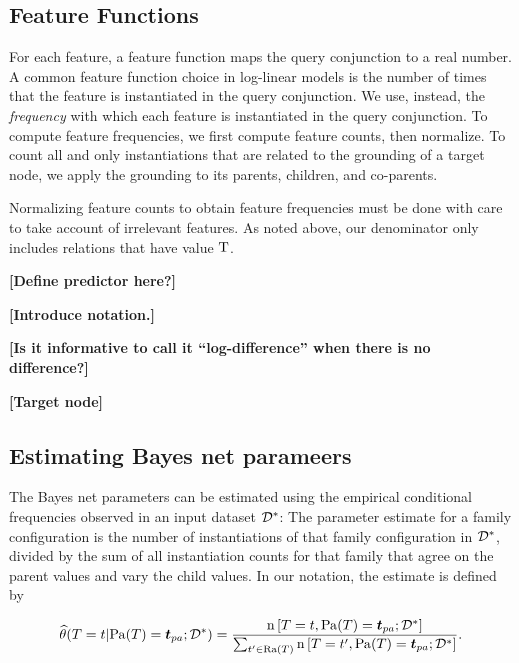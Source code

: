 \documentclass[runningheads,a4paper]{llncs}
\newcommand{\fixneeded}[1]{\textbf{[\footnotesize #1]}}
\begin{document}
\subsection{Feature Functions} \label{sec:predictors}
For each feature, a feature function maps the query conjunction to a real number. A common feature function choice in log-linear models is the number of times that the feature is instantiated in the query conjunction. 
We use, instead, the {\em frequency} with which each feature
is instantiated in the query conjunction. 
To compute feature frequencies, we first compute feature counts, then normalize.
To count all and only instantiations that are related to the grounding of a target node, we apply the grounding to its parents, children, and co-parents.

Normalizing feature counts to obtain feature frequencies must be done with care to take account of irrelevant features. As noted above, our denominator only includes relations that have value $\mathrm{T}$.

\fixneeded{Define predictor here?}

\fixneeded{Introduce notation.}

\fixneeded{Is it informative to call it ``log-difference'' when there is no difference?}

\fixneeded{Target node}

\subsection{Estimating Bayes net parameers}

The Bayes net parameters can be estimated using the empirical conditional frequencies observed in an input dataset $\mathcal{D}^{*}\hspace{0.0ex}$: The parameter estimate for a family configuration is the number of instantiations of that family configuration in $\mathcal{D}^{*}\hspace{0.0ex}$, divided by the sum of all instantiation counts for that family that agree on the parent values and vary the child values. In our notation, the estimate is defined by

\newcommand{\CTPa}{\Count{\Appendterm{\TT = \TV} {\Pa{\TT} = \Prange{\TT}}}  {\FG{\D}}}
\newcommand{\CTPb}{\Count{\Appendterm{\TT = \TV'} {\Pa{\TT} = \Prange{\TT}}}  {\FG{\D}}}

\begin{equation} \label{eq:frequencies}
\estcprob{\TT = \TV} {\Pa{\TT} = \Prange{\TT}} {\FG{\D}} = 
    \frac{\CTPa}
           {\sum_{\TV' \in \Range{\TT}}\CTPb}.
\end{equation}
\end{document}
